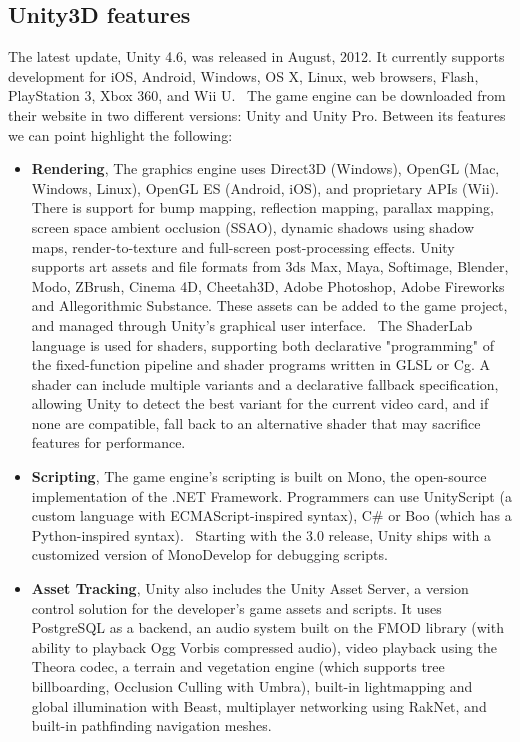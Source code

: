 \subsection{Unity3D features}
\label{subsec:unityfeatures}
The latest update, Unity 4.6, was released in August, 2012. It currently supports development for iOS, Android, Windows, OS X, Linux, web browsers, Flash, PlayStation 3, Xbox 360, and Wii U.~\cite{unitypress2} The game engine can be downloaded from their website in two different versions: Unity and Unity Pro. Between its features we can point highlight the following:
\begin{itemize}
\item \textbf{Rendering}, The graphics engine uses Direct3D (Windows), OpenGL (Mac, Windows,
Linux), OpenGL ES (Android, iOS), and proprietary APIs (Wii). There is support for bump mapping, reflection mapping, parallax mapping, screen space ambient occlusion (SSAO), dynamic shadows using shadow maps, render-to-texture and full-screen post-processing effects.
Unity supports art assets and file formats from 3ds Max, Maya, Softimage, Blender, Modo, ZBrush, Cinema 4D, Cheetah3D, Adobe Photoshop, Adobe Fireworks and Allegorithmic Substance. These assets can be added to the game project, and managed through Unity's graphical user interface.~\cite{unitypress3}
The ShaderLab language is used for shaders, supporting both declarative "programming" of the fixed-function pipeline and shader programs written in GLSL or Cg. A shader can include multiple variants and a declarative fallback specification, allowing Unity to detect the best variant for the current video card, and if none are compatible, fall back to an alternative shader that may sacrifice features for performance.~\cite{unitypress4}
\item \textbf{Scripting}, The game engine's scripting is built on Mono, the open-source implementation
of the .NET Framework. Programmers can use UnityScript (a custom language with ECMAScript-inspired syntax), C\# or Boo (which has a Python-inspired syntax).~\cite{unitypress5} Starting with the 3.0 release, Unity ships with a customized version of MonoDevelop for debugging scripts.~\cite{unitypress6}
\item \textbf{Asset Tracking}, Unity also includes the Unity Asset Server, a version control solution for the developer's game assets and scripts. It uses PostgreSQL as a backend, an audio system built on the FMOD library (with ability to playback Ogg Vorbis compressed audio), video playback using the Theora codec, a terrain and vegetation engine (which supports tree billboarding, Occlusion Culling with Umbra), built-in lightmapping and global illumination with Beast, multiplayer networking using RakNet, and built-in pathfinding navigation meshes.~\cite{unitypress7}

\end{itemize}
